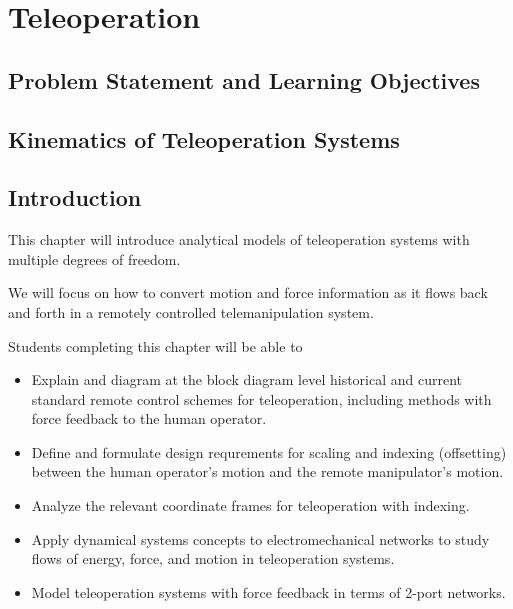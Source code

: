 %

\chapter{Teleoperation}

\section{Problem Statement and Learning Objectives}



%
%
%
%



\section*{Kinematics of Teleoperation Systems}

\section{Introduction}
This chapter will introduce analytical models of teleoperation systems with multiple degrees of freedom.

We will focus on how to convert motion and force information as it flows back 
and forth in a remotely controlled telemanipulation system.

Students completing this chapter will be able to
\begin{itemize}
\item Explain and diagram at the block diagram level historical and current standard
remote control schemes for teleoperation, including methods with force feedback to the 
human operator. 
\item Define and formulate design requrements for scaling and indexing (offsetting)
between the human operator's motion and the remote manipulator's motion. 
\item Analyze the relevant coordinate frames for teleoperation with indexing. 
\item Apply dynamical systems concepts to electromechanical networks to study 
flows of energy, force, and motion in teleoperation systems.
\item Model teleoperation systems with force feedback in terms of 2-port networks. 
\end{itemize}


